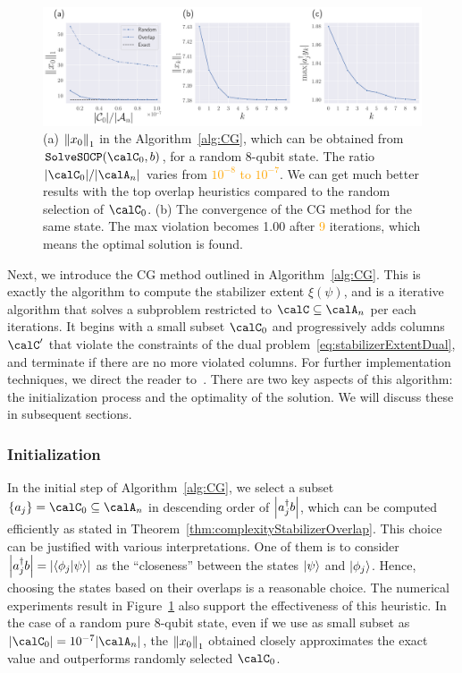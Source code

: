 \documentclass[a4paper, onecolumn, 11pt, longbibliography]{quantumarticle}
\newcommand{\orange}[1]{\textcolor{orange}{#1}}
\begin{document}
\begin{figure}[t]
  \centering
  \includegraphics[width=\columnwidth]{../../image/CG_7.pdf}
  \caption{
    (a) $\norm{x_0}_1$ in the Algorithm~\ref{alg:CG},
    which can be obtained from $\texttt{SolveSOCP}(\calC_0, b)$,
    for a random 8-qubit state.
    The ratio $\abs{\calC_0}/\abs{\calA_n}$
    varies from \orange{$10^{-8}$ to $10^{-7}$}.
    We can get much better results
    with the top overlap heuristics
    compared to the random selection of $\calC_0$.
    (b) The convergence of the CG method
    for the same state.
    The max violation becomes 1.00
    after \orange{9} iterations, which means
    the optimal solution is found.
  }
  \label{fig:CG}
\end{figure}

Next, we introduce the CG method
outlined in Algorithm~\ref{alg:CG}.
This is exactly the algorithm to compute
the stabilizer extent $\xi(\psi)$,
and is a iterative algorithm that solves
a subproblem restricted to $\calC \subseteq \calA_n$
per each iterations.
It begins with a small subset $\calC_0$
and progressively adds columns $\calC'$
that violate the constraints of the dual problem~\eqref{eq:stabilizerExtentDual},
and terminate if there are no more violated columns.
For further implementation techniques,
we direct the reader
to~\cite{hamaguchiHandbookEfficientlyQuantifying2023}.
There are two key aspects of this algorithm:
the initialization process and
the optimality of the solution.
We will discuss these
in subsequent sections.

\subsubsection{Initialization}

In the initial step of Algorithm~\ref{alg:CG},
we select a subset $\{a_j\} = \calC_0 \subseteq \calA_n$
in descending order of $\abs{a_j^\dagger b}$,
which can be computed efficiently
as stated in Theorem~\ref{thm:complexityStabilizerOverlap}.
This choice can be justified with various interpretations.
One of them is to consider
$\abs{a_j^\dagger b} = \abs{\braket{\phi_j}{\psi}}$
as the ``closeness'' between the states
$\ket{\psi}$ and $\ket{\phi_j}$.
Hence, choosing the states based on their overlaps
is a reasonable choice.
The numerical experiments result
in Figure~\ref{fig:CG}
also support the effectiveness of this heuristic.
In the case of a random pure 8-qubit state,
even if we use as small subset as
$\abs{\calC_0} = 10^{-7} \abs{\calA_n}$,
the $\norm{x_0}_1$ obtained closely approximates the exact value
and outperforms randomly selected $\calC_0$.
\end{document}
